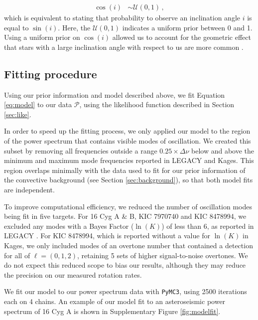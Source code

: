 \begin{equation}
	\begin{split}
		\cos(i) &\sim \mathcal{U}(0, 1)\, ,
	\end{split}
\end{equation}
which is equivalent to stating that probability to observe an inclination angle $i$ is equal to $\sin(i)$. Here, the $\mathcal{U}(0,1)$ indicates a uniform prior between 0 and 1. Using a uniform prior on $\cos(i)$ allowed us to account for the geometric effect that stars with a large inclination angle with respect to us are more common \cite{chaplin+basu2017}.

\subsection{Fitting procedure}
Using our prior information and model described above, we fit Equation \ref{eq:model} to our data $\mathcal{P}$, using the likelihood function described in Section \ref{sec:like}.

In order to speed up the fitting process, we only applied our model to the region of the power spectrum that contains visible modes of oscillation. We created this subset by removing all frequencies outside a range $0.25 \times \Delta\nu$ below and above the minimum and maximum mode frequencies reported in LEGACY and Kages. This region overlaps minimally with the data used to fit for our prior information of the convective background (see Section \ref{sec:background}), so that both model fits are independent.

To improve computational efficiency, we reduced the number of oscillation modes being fit in five targets. For 16 Cyg A \& B, KIC 7970740 and KIC 8478994, we excluded any modes with a Bayes Factor ($\ln(K)$) of less than 6, as reported in LEGACY \cite{davies+2016,lund+2017,kass+raftery1995}. For KIC 8478994, which is reported without a value for $\ln(K)$ in Kages, we only included modes of an overtone number that contained a detection for all of $\ell = (0, 1, 2)$, retaining 5 sets of higher signal-to-noise overtones. We do not expect this reduced scope to bias our results, although they may reduce the precision on our measured rotation rates.

We fit our model to our power spectrum data with \texttt{PyMC3}, using 2500 iterations each on 4 chains. An example of our model fit to an asteroseismic power spectrum of 16 Cyg A is shown in Supplementary Figure \ref{fig:modelfit}.

